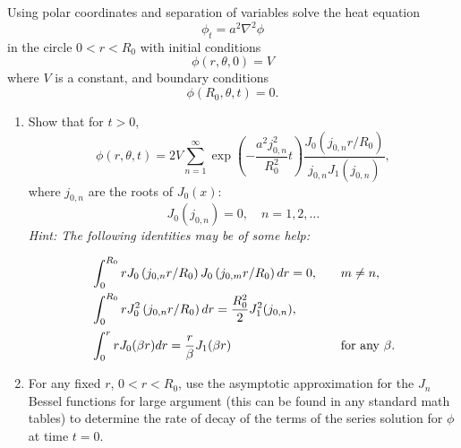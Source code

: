 {%
\begin{Exercise}
  \label{exercise heat polar separation}
  Using polar coordinates and separation of variables
  solve the heat equation
  \[
  \phi_t = a^2 \nabla^2 \phi
  \]
  in the circle $0 < r < R_0$ with initial conditions
  \[
  \phi(r,\theta,0) = V
  \]
  where $V$ is a constant, and boundary conditions
  \[
  \phi(R_0,\theta,t) = 0.  
  \]
  \begin{enumerate}
  \item Show that for $t > 0$,
    \[
    \phi(r,\theta,t) = 2V \sum_{n=1}^\infty
    \exp\left(- \frac{a^2 j_{0,n}^2}{R_0^2} t \right) 
    \frac{ J_0\left({j_{0,n} r  / R_0}\right)}
    {j_{0,n} J_1(j_{0,n})},
    \]
    where $j_{0,n}$ are the roots of $J_0(x)$:
    \begin{displaymath}
      J_0(j_{0,n}) = 0,\quad n = 1,2,\ldots
    \end{displaymath}
    {\it Hint: The following identities may be of some help:}
    \begin{displaymath}
      \begin{array}{ll}
        \rule[-3mm]{0mm}{10mm}\displaystyle \int_0^{R_0} r
        J_0\left({j_{0,n}r / R_0}\right) 
        J_0\left({j_{0,m}r / R_0}\right)dr = 0, &\quad m \neq n, \\
        \rule[-3mm]{0mm}{10mm}\displaystyle \int_0^{R_0} r
        J_0^2\left({j_{0,n}r / R_0}\right) dr = \frac{R_0^2}{2}
        J_1^2(j_{0,n}), & \\ 
        \rule[-3mm]{0mm}{10mm}\displaystyle \int_0^r r J_0(\beta r) dr
        = \frac{r}{\beta} J_1(\beta r)&\quad {\rm for~any~}\beta.\\ 
      \end{array}
    \end{displaymath}
  \item For any fixed $r$, $0 < r < R_0$, use the asymptotic approximation
    for the $J_n$ Bessel functions for large argument (this can be found
    in any standard math tables) to
    determine the rate of decay of the terms of the series solution for
    $\phi$ at time $ t = 0$. 
  \end{enumerate}

\end{Exercise}






}
